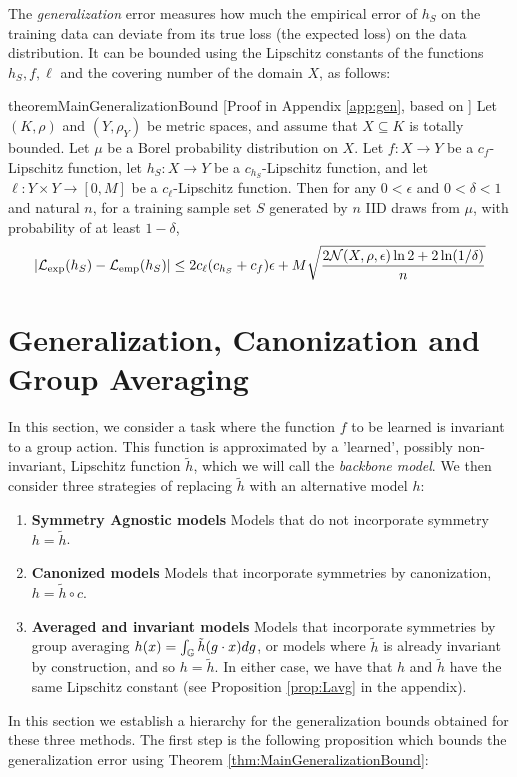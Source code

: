 The \emph{generalization} error measures how much the empirical error of $h_S$ on the training data can deviate from its true loss (the expected loss) on the data distribution. It can be bounded  using the Lipschitz constants of the functions $h_S,f,\ell$ and the covering number of the domain $X$, as follows:

\begin{restatable}{theorem}{MainGeneralizationBound}
\label{thm:MainGeneralizationBound}[Proof  in Appendix \ref{app:gen}, based on \cite{xu_robustness_2012} ]
Let $(K,\rho)$ and $(Y,\rho_Y)$ be metric spaces, and assume that $X\subseteq K$ is totally bounded. Let $\mu$ be a Borel probability distribution on $X$.  Let $f:X\to Y$ be a $c_f$-Lipschitz function, let $h_S:X\to Y$ be a $c_{h_S}$-Lipschitz function, and let $\ell:Y\times Y\to[0,M]$ be a $c_\ell$-Lipschitz function. Then for any $0<\epsilon$ and $0<\delta<1$ and natural $n$,  for a training sample set $S$ generated by $n$ IID draws from  $\mu$, with probability of at least $ 1-\delta$,
$$|\mathcal{L}_{\mathrm{exp}}(h_S) - \mathcal{L}_{\mathrm{emp}}(h_S)| \le 2c_\ell (c_{h_S}+c_f)\epsilon+M \sqrt{\frac{2\mathcal{N}( X, \rho,\epsilon)\ln 2 + 2 \ln(1/\delta)}{n}}$$
\end{restatable}


\section{Generalization, Canonization and Group Averaging}\label{sec:gen}
In this section, we consider a task where the function  $f$ to be learned is invariant to a group action. This function is approximated by a 'learned', possibly non-invariant,  Lipschitz function $\tilde h$, which we will call the \emph{backbone model}.  We then consider three strategies of replacing  $\tilde h$ with an alternative model $h$:
\begin{enumerate}
  \item \textbf{Symmetry Agnostic models} Models that do not incorporate symmetry $h=\tilde h$.
  \item \textbf{Canonized models}  Models that incorporate symmetries by canonization, $h= \tilde h \circ c $.
  \item \textbf{Averaged and invariant models} Models that incorporate symmetries by group averaging $h(x)=\int_{\mathbb{G}} \tilde{h}(g\cdot x)dg $, or models where $\tilde h$ is already invariant by construction, and so $h=\tilde h $. In either case, we have that $h$ and $\tilde h$ have the same Lipschitz constant (see Proposition \ref{prop:Lavg} in the appendix).
\end{enumerate}
In this section we establish a hierarchy for the generalization bounds obtained for these three methods. The first step is the following proposition which bounds the generalization error using Theorem \ref{thm:MainGeneralizationBound}:

